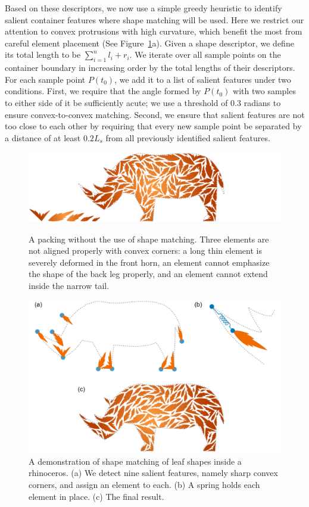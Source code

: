 Based on these descriptors, we now use a simple greedy heuristic to identify salient container features where shape matching will be used.
Here we restrict our attention to convex protrusions with high curvature, which benefit the most from careful element placement (See Figure~\ref{rhino_packing}a).  Given a shape descriptor, we define its total length to be $\sum_{i=1}^nl_i+r_i$.  We iterate over all sample points on the container boundary in increasing order by the total lengths of their descriptors.  For each sample point $P(t_0)$, we add it to a list of salient features under two conditions. First, we require that the angle formed by $P(t_0)$ with two samples to either side of it be sufficiently acute; we use a threshold of 0.3 radians to ensure convex-to-convex matching.
Second, we ensure that salient features are not too close to each other by requiring that every new sample point be separated by a distance of at least $0.2L_s$ from all previously identified salient features.


\begin{figure}%
\centering
\includegraphics[width=1.0\textwidth]{figures/repulsionpak/rhino_bad.pdf}
\caption[A packing without the use of shape matching]{
  \label{rhino_bad}
  \newtext
  {
  A packing without the use of shape matching. 
Three elements are not aligned properly with convex corners: a long thin element is severely deformed in the front horn, 
an element cannot emphasize the shape of the back leg properly, and an element cannot extend inside the narrow tail.}
}
\centering
\includegraphics[width=1.0\textwidth]{figures/repulsionpak/rhino_shape_matching_bitmap_2.pdf} 
\caption[A demonstration of shape matching to place elements]
{\label{rhino_packing}
{ 
A demonstration of shape matching of leaf shapes inside a rhinoceros. 
(a) We detect nine salient features, namely sharp convex corners, and 
assign an element to each.
(b) A spring holds each element in place.
(c) The final result.
}
}
\end{figure}

